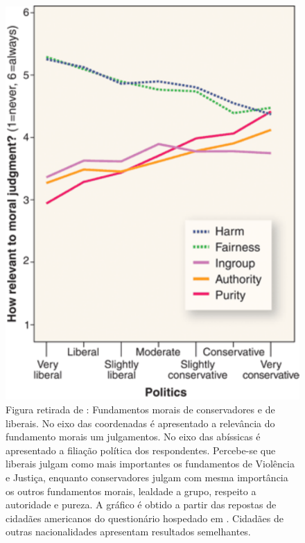 \begin{figure} 
\centering
\includegraphics[scale=0.6]{Figures/haidt_science}
\caption{Figura retirada de \citep{Haidt2007}: Fundamentos morais de
conservadores e de liberais. No eixo das coordenadas é apresentado a relevância
do fundamento morais um julgamentos. No eixo das abíssicas é apresentado a
filiação política dos respondentes. Percebe-se que liberais julgam como mais
importantes os fundamentos de Violência e Justiça, enquanto conservadores
julgam com mesma importância os outros fundamentos morais, lealdade a grupo,
respeito a autoridade e pureza. A gráfico é obtido a partir das repostas de
cidadães americanos do questionário hospedado em \citep{Quest}. Cidadães de
outras nacionalidades apresentam resultados semelhantes.}
\label{fig:haidt}
\end{figure}

